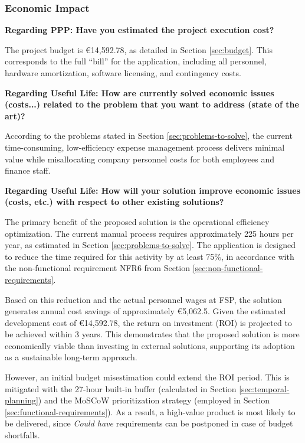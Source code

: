 
\subsubsection{Economic Impact}


\textbf{Regarding PPP: Have you estimated the project execution cost?}
\vspace{-5pt}

The project budget is €14,592.78, as detailed in Section \ref{sec:budget}. This corresponds to the full “bill” for the application, including all personnel, hardware amortization, software licensing, and contingency costs.


\textbf{Regarding Useful Life: How are currently solved economic issues (costs...) related to the problem that you want to address (state of the art)?}
\vspace{-5pt}

According to the problems stated in Section \ref{sec:problems-to-solve}, the current time-consuming, low-efficiency expense management process delivers minimal value while misallocating company personnel costs for both employees and finance staff.


\textbf{Regarding Useful Life: How will your solution improve economic issues (costs, etc.) with respect to other existing solutions?}
\vspace{-5pt}

The primary benefit of the proposed solution is the operational efficiency optimization. The current manual process requires approximately 225 hours per year, as estimated in Section \ref{sec:problems-to-solve}. The application is designed to reduce the time required for this activity by at least 75\%, in accordance with the non-functional requirement NFR6 from Section \ref{sec:non-functional-requirements}.

Based on this reduction and the actual personnel wages at FSP, the solution generates annual cost savings of approximately €5,062.5. Given the estimated development cost of €14,592.78, the return on investment (ROI) is projected to be achieved within 3 years. This demonstrates that the proposed solution is more economically viable than investing in external solutions, supporting its adoption as a sustainable long-term approach.

However, an initial budget misestimation could extend the ROI period. This is mitigated with the 27-hour built-in buffer (calculated in Section \ref{sec:temporal-planning}) and the MoSCoW prioritization strategy (employed in Section \ref{sec:functional-requirements}). As a result, a high-value product is most likely to be delivered, since \textit{Could have} requirements can be postponed in case of budget shortfalls. 

